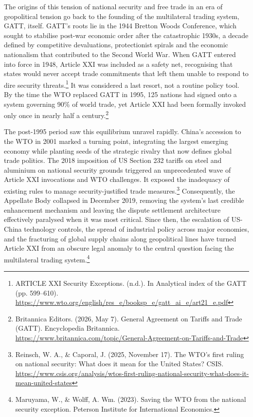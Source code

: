 The origins of this tension of national security and free trade in an era of geopolitical tension go back to the founding of the multilateral trading system, GATT, itself. GATT’s roots lie in the 1944 Bretton Woods Conference, which sought to stabilise post-war economic order after the catastrophic 1930s, a decade defined by competitive devaluations, protectionist spirals and the economic nationalism that contributed to the Second World War. When GATT entered into force in 1948, Article XXI was included as a safety net, recognising that states would never accept trade commitments that left them unable to respond to dire security threats.\footnote{ARTICLE XXI Security Exceptions. (n.d.). In Analytical index of the GATT (pp. 599–610). \url{https://www.wto.org/english/res_e/booksp_e/gatt_ai_e/art21_e.pdf}} It was considered a last resort, not a routine policy tool. By the time the WTO replaced GATT in 1995, 125 nations had signed onto a system governing 90\% of world trade, yet Article XXI had been formally invoked only once in nearly half a century.\footnote{Britannica Editors. (2026, May 7). General Agreement on Tariffs and Trade (GATT). Encyclopedia Britannica. \url{https://www.britannica.com/topic/General-Agreement-on-Tariffs-and-Trade}}

The post-1995 period saw this equilibrium unravel rapidly. China’s accession to the WTO in 2001 marked a turning point, integrating the largest emerging economy while planting seeds of the strategic rivalry that now defines global trade politics. The 2018 imposition of US Section 232 tariffs on steel and aluminium on national security grounds triggered an unprecedented wave of Article XXI invocations and WTO challenges. It exposed the inadequacy of existing rules to manage security-justified trade measures.\footnote{Reinsch, W. A., \& Caporal, J. (2025, November 17). The WTO's first ruling on national security: What does it mean for the United States? CSIS. \url{https://www.csis.org/analysis/wtos-first-ruling-national-security-what-does-it-mean-united-states}} Consequently, the Appellate Body collapsed in December 2019, removing the system’s last credible enhancement mechanism and leaving the dispute settlement architecture effectively paralysed when it was most critical. Since then, the escalation of US-China technology controls, the spread of industrial policy across major economies, and the fracturing of global supply chains along geopolitical lines have turned Article XXI from an obscure legal anomaly to the central question facing the multilateral trading system.\footnote{Maruyama, W., \& Wolff, A. Wm. (2023). Saving the WTO from the national security exception. Peterson Institute for International Economics.}
